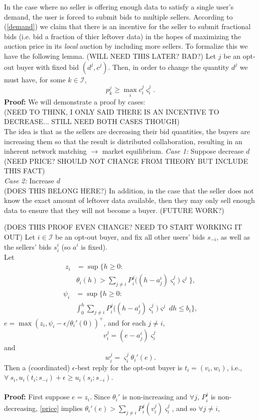 \documentclass[12pt]{article}
\theoremstyle{definition}
\newcommand{\vs}{\varsigma}
\newcommand{\mcI}{\mathcal{I}}
\begin{document}
\begin{multicols}{2}
In the case where no seller is offering enough data to satisfy a single user's
demand, the user is forced to submit bids to multiple sellers. According to (\ref{demand}) we claim that there is an incentive for the seller to
submit fractional bids (i.e. bid a fraction of thier leftover data) in the hopes
of maximizing the auction price in its
\emph{local} auction by including more sellers. To
formalize this we have the following lemma. (WILL NEED THIS LATER? BAD?)
{
\label{incentive}
Let $j$ be an opt-out buyer with fixed bid $(d^j,c^j)$. Then, in order to change the
quantity $d^j$ we must have, for some $k \in \mcI$,
\begin{equation}
       p_k^j \ge \max_i c_i^j\vs_i^j.
\end{equation}
}
\textbf{Proof:}
We will demonstrate a proof by cases:\\
(NEED TO THINK, I ONLY SAID THERE IS AN INCENTIVE TO DECREASE... STILL NEED
BOTH CASES THOUGH)\\
The idea is that as the sellers are decreasing their bid quantities, the buyers
are increasing them so that the result is distributed collaboration, resulting
in an inherent network matching $\rightarrow$ market equilibrium.
\emph{Case 1:} Suppose decrease $d$ (NEED PRICE? SHOULD NOT CHANGE FROM THEORY
BUT INCLUDE THIS FACT)\\
\emph{Case 2:} Increase $d$\\

(DOES THIS BELONG HERE?)
In addition, in the case that the seller does not know the exact amount of
leftover data available, then they may only sell enough data to ensure that
they will not become a buyer. (FUTURE WORK?)


{
(DOES THIS PROOF EVEN CHANGE? NEED TO START WORKING IT OUT)
Let $i\in\mcI$ be an opt-out buyer, and fix all other users' bids
$s_{-i}$, as well as the sellers' bids $s_i^i$ (so $a^i$ is fixed). \\
Let 
\begin{align}
    z_i &= \sup\bigg\lbrace h\ge 0 : \\
& \theta_i(h) > \displaystyle\sum_{j\ne i}
P_i^j\big((h-a_j^i)\vs_i^j\big)\vs^j\bigg\rbrace, 
\end{align}
\begin{align}\label{price}
    \psi_i &= \sup\bigg\lbrace h\ge 0: \\
&\displaystyle\int_0^h \displaystyle\sum_{j\ne i}
P_i^j\big((h-a_j^i)\vs_i^j\big)\vs^j \ dh \le b_i\bigg\rbrace,
\end{align}
$e = \max(z_i, \psi_i - \epsilon / \theta_i'(0))^+$, and for each $j\ne i$, 
$$
    v_i^j = (e - a_j^i)\vs_i^j
$$
and 
$$
    w_i^j = \vs_i^j\theta_i'(e).
$$
Then a (coordinated) $\epsilon$-best reply for the opt-out buyer is $t_i =
(v_i,w_i)$, i.e., $\forall \ s_i, u_i(t_i;s_{-i}) + \epsilon \ge u_i(s_i;
s_{-i})$.
} \\ \\
\textbf{Proof:} First suppose $e = z_i$. Since $\theta_i'$ is non-increasing
and $\forall j$, $P_i^j$ is non-decreasing, \ref{price} implies $\theta_i'(e) >
\sum_{j\ne i} P_i^j(v_i^j)\vs_i^j$, and so $\forall j\ne i$, 


\end{multicols}
\end{document}
